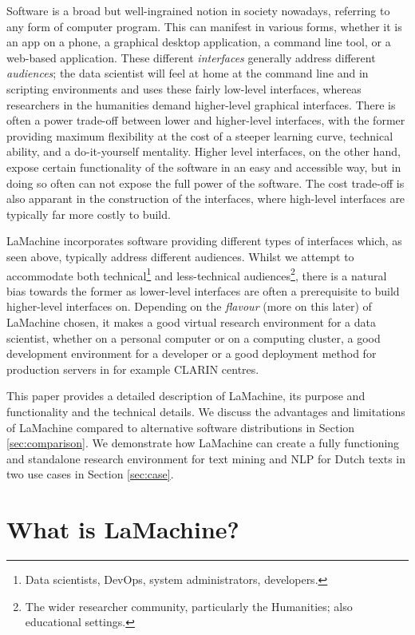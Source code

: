 \documentclass[a4paper,11pt]{article}
\begin{document}
Software is a broad but well-ingrained notion in society nowadays, referring to any form of computer program. This can
manifest in various forms, whether it is an app on a phone, a graphical desktop application, a command line tool, or a
web-based application. These different \emph{interfaces} generally address different \emph{audiences}; the data
scientist will feel at home at the command line and in scripting environments and uses these fairly low-level
interfaces, whereas researchers in the humanities demand higher-level graphical interfaces. There is often a power trade-off
between lower and higher-level interfaces, with the former providing maximum flexibility at the cost of a steeper
learning curve, technical ability, and a do-it-yourself mentality. Higher level interfaces, on the other
hand, expose certain functionality of the software in an easy and accessible way, but in doing so often can not expose
the full power of the software. The cost trade-off is also apparant in the construction of the interfaces, where
high-level interfaces are typically far more costly to build.

LaMachine incorporates software providing different types of interfaces which, as seen above, typically address different audiences. Whilst we
attempt to accommodate both technical\footnote{Data scientists, DevOps, system administrators, developers.} and
less-technical audiences\footnote{The wider researcher community, particularly the Humanities; also educational
settings.}, there is a natural bias towards the former as lower-level interfaces are often a prerequisite to build
higher-level interfaces on. Depending on the \emph{flavour} (more on this later) of LaMachine chosen, it makes a good virtual research
environment for a data scientist, whether on a personal computer or on a computing cluster, a good development
environment for a developer or a good deployment method for production servers in for example CLARIN centres.

 This paper provides a detailed description of LaMachine, its purpose and functionality and the technical details. We
 discuss the advantages and limitations of LaMachine compared to alternative software distributions in Section \ref{sec:comparison}. We demonstrate how LaMachine can create a fully functioning and standalone research environment for text mining  and NLP for Dutch texts in two use cases in Section \ref{sec:case}.

 \section{What is LaMachine?}
\end{document}
